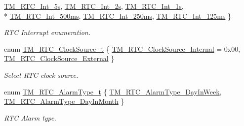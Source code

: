 \begin{DoxyCompactItemize}
\hyperlink{group___t_m___r_t_c___typedefs_gga05e753ad5f63f28a20fe9f3b85e799f2ab29f4d48a6b77b7b42e8d1662b45ec41}{T\+M\+\_\+\+R\+T\+C\+\_\+\+Int\+\_\+5s}, 
\hyperlink{group___t_m___r_t_c___typedefs_gga05e753ad5f63f28a20fe9f3b85e799f2a9eb35942f5a16621500f5a6fa6ede1e1}{T\+M\+\_\+\+R\+T\+C\+\_\+\+Int\+\_\+2s}, 
\hyperlink{group___t_m___r_t_c___typedefs_gga05e753ad5f63f28a20fe9f3b85e799f2ad956fd15a6c14d25720ea675825c23ab}{T\+M\+\_\+\+R\+T\+C\+\_\+\+Int\+\_\+1s}, 
\\*
\hyperlink{group___t_m___r_t_c___typedefs_gga05e753ad5f63f28a20fe9f3b85e799f2a3ac0536e0b710f85451872984195c8f9}{T\+M\+\_\+\+R\+T\+C\+\_\+\+Int\+\_\+500ms}, 
\hyperlink{group___t_m___r_t_c___typedefs_gga05e753ad5f63f28a20fe9f3b85e799f2a9cbcfe25519c2aa2a55f1af2d72aa19d}{T\+M\+\_\+\+R\+T\+C\+\_\+\+Int\+\_\+250ms}, 
\hyperlink{group___t_m___r_t_c___typedefs_gga05e753ad5f63f28a20fe9f3b85e799f2a66cc3516e9208bb6e5c28635106be9fb}{T\+M\+\_\+\+R\+T\+C\+\_\+\+Int\+\_\+125ms}
 \}
\begin{DoxyCompactList}\small\item\em R\+T\+C Interrupt enumeration. \end{DoxyCompactList}\item 
enum \hyperlink{group___t_m___r_t_c___typedefs_ga944a179f7f7042272040b3464ab89eb5}{T\+M\+\_\+\+R\+T\+C\+\_\+\+Clock\+Source\+\_\+t} \{ \hyperlink{group___t_m___r_t_c___typedefs_gga944a179f7f7042272040b3464ab89eb5aee0e2b895cc0067dcfa19f258813bdd5}{T\+M\+\_\+\+R\+T\+C\+\_\+\+Clock\+Source\+\_\+\+Internal} = 0x00, 
\hyperlink{group___t_m___r_t_c___typedefs_gga944a179f7f7042272040b3464ab89eb5a1eec7d5db7c364bdcdf9f700206d9dd3}{T\+M\+\_\+\+R\+T\+C\+\_\+\+Clock\+Source\+\_\+\+External}
 \}
\begin{DoxyCompactList}\small\item\em Select R\+T\+C clock source. \end{DoxyCompactList}\item 
enum \hyperlink{group___t_m___r_t_c___typedefs_gaf7ce20d46cd105428f15c7f45b3b0882}{T\+M\+\_\+\+R\+T\+C\+\_\+\+Alarm\+Type\+\_\+t} \{ \hyperlink{group___t_m___r_t_c___typedefs_ggaf7ce20d46cd105428f15c7f45b3b0882af7f180386b56c0bb0c0947ffa8835671}{T\+M\+\_\+\+R\+T\+C\+\_\+\+Alarm\+Type\+\_\+\+Day\+In\+Week}, 
\hyperlink{group___t_m___r_t_c___typedefs_ggaf7ce20d46cd105428f15c7f45b3b0882aa37801e1c78b16c4aef0cdd55abfedbd}{T\+M\+\_\+\+R\+T\+C\+\_\+\+Alarm\+Type\+\_\+\+Day\+In\+Month}
 \}
\begin{DoxyCompactList}\small\item\em R\+T\+C Alarm type. \end{DoxyCompactList}\item 

\end{DoxyCompactItemize}
